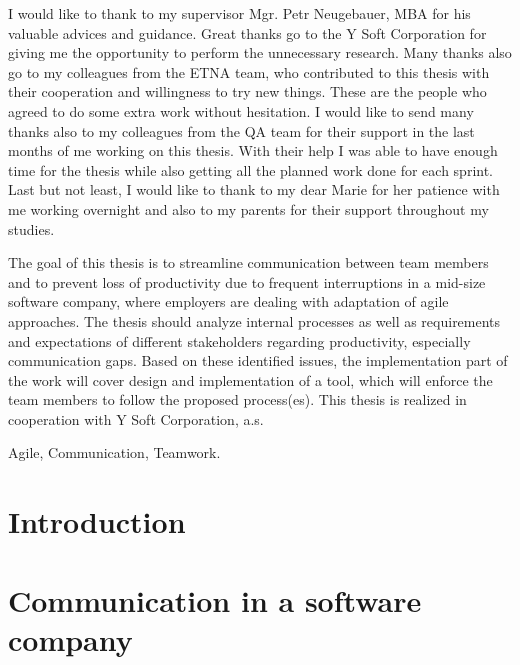 \documentclass[11pt,singleside]{myfithesis2}
\begin{document}
\FrontMatter
\ThesisTitlePage
\begin{ThesisDeclaration}
\DeclarationText
\AdvisorName
\end{ThesisDeclaration}
\begin{ThesisThanks}
I would like to thank to my supervisor Mgr. Petr Neugebauer, MBA for his valuable advices and guidance. Great thanks go to the Y Soft Corporation for giving me the opportunity to perform the unnecessary research. Many thanks also go to my colleagues from the ETNA team, who contributed to this thesis with their cooperation and willingness to try new things. These are the people who agreed to do some extra work without hesitation. I would like to send many thanks also to my colleagues from the QA team for their support in the last months of me working on this thesis. With their help I was able to have enough time for the thesis while also getting all the planned work done for each sprint. Last but not least, I would like to thank to my dear Marie for her patience with me working overnight and also to my parents for their support throughout my studies. 
\end{ThesisThanks}
\begin{ThesisAbstract}
The goal of this thesis is to streamline communication between team members and to prevent loss of productivity due to frequent interruptions in a mid-size software company, where employers are dealing with adaptation of agile approaches. The thesis should analyze internal processes as well as requirements and expectations of different stakeholders regarding productivity, especially communication gaps. Based on these identified issues, the implementation part of the work will cover design and implementation of a tool, which will enforce the team members to follow the proposed process(es). This thesis is realized in cooperation with Y Soft Corporation, a.s.
\end{ThesisAbstract}
\begin{ThesisKeyWords}
Agile, Communication, Teamwork.
\end{ThesisKeyWords}
\MainMatter
\tableofcontents %

\chapter{Introduction}

\chapter{Communication in a software company}
\end{document}
